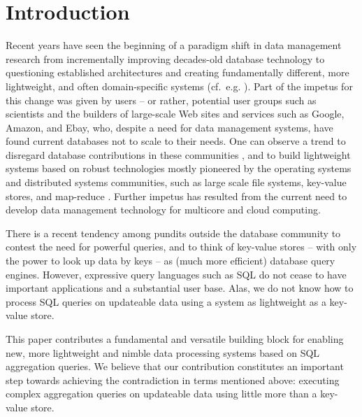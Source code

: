 \section{Introduction}


Recent years have seen the beginning of a paradigm shift in data management
research from incrementally
improving decades-old database technology
%
%
to questioning established
architectures and creating fundamentally different, more lightweight, and
often domain-specific systems (cf.\ e.g. \cite{DBLP:conf/vldb/StonebrakerMAHHH07,DBLP:journals/pvldb/KallmanKNPRZJMSZHA08}).
Part of the impetus for this change was given by users --
or rather, potential user groups such as scientists and the builders of
large-scale Web sites and services such as Google, Amazon, and Ebay,
who, despite a need for data management systems, have found current databases
not to scale to their needs.
One can observe a trend to disregard database contributions
in these communities \cite{dbcolumn, DBLP:conf/sigmod/PavloPRADMS09}, and to build lightweight systems based on
robust technologies mostly pioneered by the operating systems and distributed
systems communities, such as large scale file systems, key-value stores, and
map-reduce
\cite{DBLP:journals/cacm/DeanG08, DBLP:journals/tocs/ChangDGHWBCFG08}.
Further impetus has resulted from the current need to develop data management
technology for multicore and cloud computing.
%

There is a recent tendency among pundits outside the database community to
contest the need for powerful queries, and to
think of key-value stores -- with only the power to look up data by
keys -- as (much more efficient) database query engines.
%
%
However, expressive query languages such as SQL do not cease to have
important applications and a substantial user base.
Alas, we do not know how to process SQL queries on updateable data
using a system as lightweight as a key-value store.

This paper contributes a fundamental and versatile building block for
enabling new, more lightweight and nimble data processing systems based
on SQL aggregation que\-ries. We believe that our contribution
constitutes an important
step towards achieving the contradiction in terms mentioned
above: executing complex aggregation queries on updateable data
using little more than a key-value store.

